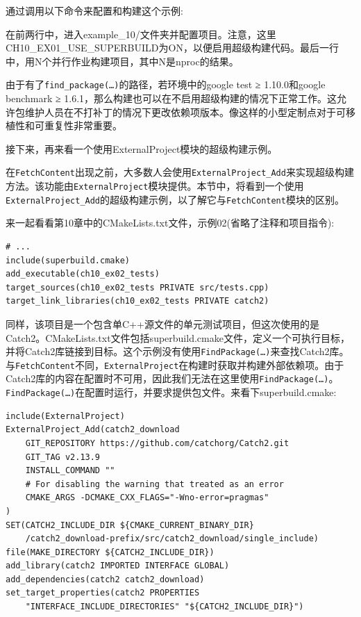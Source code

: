 通过调用以下命令来配置和构建这个示例:


在前两行中，进入example\_10/文件夹并配置项目。注意，这里CH10\_EX01\_USE\_SUPERBUILD为ON，以便启用超级构建代码。最后一行中，用N个并行作业构建项目，其中N是nproc的结果。

由于有了\texttt{find\_package(…)}的路径，若环境中的google test ≥ 1.10.0和google benchmark ≥ 1.6.1，那么构建也可以在不启用超级构建的情况下正常工作。这允许包维护人员在不打补丁的情况下更改依赖项版本。像这样的小型定制点对于可移植性和可重复性非常重要。

接下来，再来看一个使用ExternalProject模块的超级构建示例。


在\texttt{FetchContent}出现之前，大多数人会使用\texttt{ExternalProject\_Add}来实现超级构建方法。该功能由\texttt{ExternalProject}模块提供。本节中，将看到一个使用\texttt{ExternalProject\_Add}的超级构建示例，以了解它与\texttt{FetchContent}模块的区别。

来一起看看第10章中的CMakeLists.txt文件，示例02(省略了注释和项目指令):

\begin{lstlisting}[style=styleCMake]
# ...
include(superbuild.cmake)
add_executable(ch10_ex02_tests)
target_sources(ch10_ex02_tests PRIVATE src/tests.cpp)
target_link_libraries(ch10_ex02_tests PRIVATE catch2)
\end{lstlisting}

同样，该项目是一个包含单C++源文件的单元测试项目，但这次使用的是Catch2。CMakeLists.txt文件包括superbuild.cmake文件，定义一个可执行目标，并将Catch2库链接到目标。这个示例没有使用\texttt{FindPackage(…)}来查找Catch2库。与\texttt{FetchContent}不同，\texttt{ExternalProject}在构建时获取并构建外部依赖项。由于Catch2库的内容在配置时不可用，因此我们无法在这里使用\texttt{FindPackage(…)}。\texttt{FindPackage(…)}在配置时运行，并要求提供包文件。来看下superbuild.cmake:

\begin{lstlisting}[style=styleCMake]
include(ExternalProject)
ExternalProject_Add(catch2_download
	GIT_REPOSITORY https://github.com/catchorg/Catch2.git
	GIT_TAG v2.13.9
	INSTALL_COMMAND ""
	# For disabling the warning that treated as an error
	CMAKE_ARGS -DCMAKE_CXX_FLAGS="-Wno-error=pragmas"
)
SET(CATCH2_INCLUDE_DIR ${CMAKE_CURRENT_BINARY_DIR}
	/catch2_download-prefix/src/catch2_download/single_include)
file(MAKE_DIRECTORY ${CATCH2_INCLUDE_DIR})
add_library(catch2 IMPORTED INTERFACE GLOBAL)
add_dependencies(catch2 catch2_download)
set_target_properties(catch2 PROPERTIES
	"INTERFACE_INCLUDE_DIRECTORIES" "${CATCH2_INCLUDE_DIR}")
\end{lstlisting}


